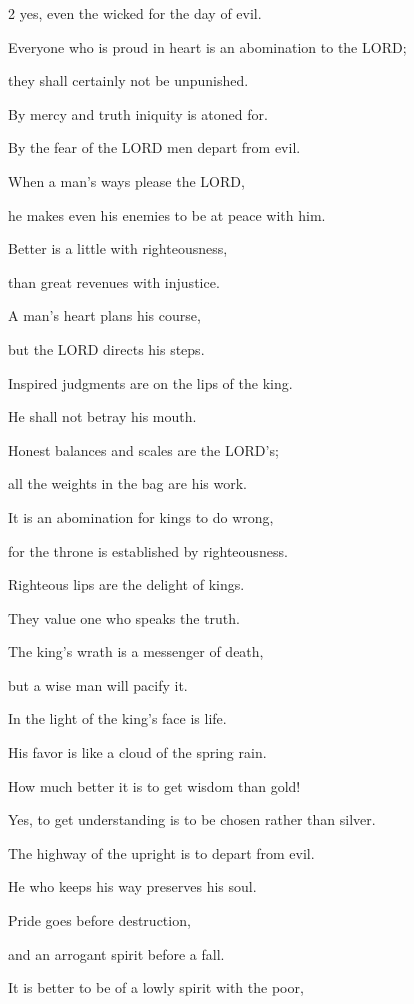 \begin{multicols}{2}
yes, even the wicked for the day of evil.


\myverse{}Everyone who is proud in heart is an abomination to the LORD;

they shall certainly not be unpunished.


\myverse{}By mercy and truth iniquity is atoned for.

By the fear of the LORD men depart from evil.


\myverse{}When a man’s ways please the LORD,

he makes even his enemies to be at peace with him.


\myverse{}Better is a little with righteousness,

than great revenues with injustice.


\myverse{}A man’s heart plans his course,

but the LORD directs his steps.


\myverse{}Inspired judgments are on the lips of the king.

He shall not betray his mouth.


\myverse{}Honest balances and scales are the LORD’s;

all the weights in the bag are his work.


\myverse{}It is an abomination for kings to do wrong,

for the throne is established by righteousness.


\myverse{}Righteous lips are the delight of kings.

They value one who speaks the truth.


\myverse{}The king’s wrath is a messenger of death,

but a wise man will pacify it.


\myverse{}In the light of the king’s face is life.

His favor is like a cloud of the spring rain.


\myverse{}How much better it is to get wisdom than gold!

Yes, to get understanding is to be chosen rather than silver.


\myverse{}The highway of the upright is to depart from evil.

He who keeps his way preserves his soul.


\myverse{}Pride goes before destruction,

and an arrogant spirit before a fall.


\myverse{}It is better to be of a lowly spirit with the poor,


\end{multicols}
